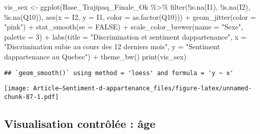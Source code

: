 \documentclass[
]{article}
\newenvironment{Shaded}{\begin{snugshade}}{\end{snugshade}}
\newcommand{\AttributeTok}[1]{\textcolor[rgb]{0.77,0.63,0.00}{#1}}
\newcommand{\ConstantTok}[1]{\textcolor[rgb]{0.00,0.00,0.00}{#1}}
\newcommand{\DecValTok}[1]{\textcolor[rgb]{0.00,0.00,0.81}{#1}}
\newcommand{\FunctionTok}[1]{\textcolor[rgb]{0.00,0.00,0.00}{#1}}
\newcommand{\NormalTok}[1]{#1}
\newcommand{\OtherTok}[1]{\textcolor[rgb]{0.56,0.35,0.01}{#1}}
\newcommand{\SpecialCharTok}[1]{\textcolor[rgb]{0.00,0.00,0.00}{#1}}
\newcommand{\StringTok}[1]{\textcolor[rgb]{0.31,0.60,0.02}{#1}}
\begin{document}
\begin{Shaded}
\begin{Highlighting}[]
\NormalTok{vis\_sex }\OtherTok{\textless{}{-}} \FunctionTok{ggplot}\NormalTok{(Base\_Trajipaq\_Finale\_Ok }\SpecialCharTok{\%\textgreater{}\%}
                \FunctionTok{filter}\NormalTok{(}\SpecialCharTok{!}\FunctionTok{is.na}\NormalTok{(I1), }\SpecialCharTok{!}\FunctionTok{is.na}\NormalTok{(I2), }\SpecialCharTok{!}\FunctionTok{is.na}\NormalTok{(Q10)), }\FunctionTok{aes}\NormalTok{(}\AttributeTok{x =}\NormalTok{ I2, }\AttributeTok{y =}\NormalTok{ I1, }\AttributeTok{color =} \FunctionTok{as.factor}\NormalTok{(Q10))) }\SpecialCharTok{+}
  \FunctionTok{geom\_jitter}\NormalTok{(}\AttributeTok{color =} \StringTok{"pink"}\NormalTok{) }\SpecialCharTok{+}
  \FunctionTok{stat\_smooth}\NormalTok{(}\AttributeTok{se =} \ConstantTok{FALSE}\NormalTok{) }\SpecialCharTok{+}
  \FunctionTok{scale\_color\_brewer}\NormalTok{(}\AttributeTok{name =} \StringTok{"Sexe"}\NormalTok{, }\AttributeTok{palette =} \DecValTok{3}\NormalTok{) }\SpecialCharTok{+}
  \FunctionTok{labs}\NormalTok{(}\AttributeTok{title =} \StringTok{"Discrimination et sentiment d\textquotesingle{}appartenance"}\NormalTok{, }
       \AttributeTok{x =} \StringTok{"Discrimination subie au cours des 12 derniers mois"}\NormalTok{, }
       \AttributeTok{y =} \StringTok{"Sentiment d\textquotesingle{}appartenance au Quebec"}\NormalTok{) }\SpecialCharTok{+}
  \FunctionTok{theme\_bw}\NormalTok{()}
\FunctionTok{print}\NormalTok{(vis\_sex)}
\end{Highlighting}
\end{Shaded}

\begin{verbatim}
## `geom_smooth()` using method = 'loess' and formula = 'y ~ x'
\end{verbatim}

\texttt{[image: Article---Sentiment-d-appartenance\_files/figure-latex/unnamed-chunk-87-1.pdf]}

\hypertarget{visualisation-contruxf4luxe9e-uxe2ge}{%
\subsection{Visualisation contrôlée :
âge}\label{visualisation-contruxf4luxe9e-uxe2ge}}
\end{document}
